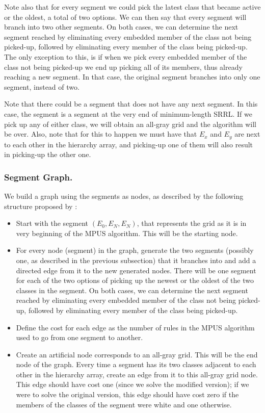  Note also that for every segment we could pick the latest class that became active or the oldest, a total of two options. We can then say that every segment will branch into two other segments. On both cases, we can determine the next segment reached by eliminating every embedded member of the class not being picked-up, followed by eliminating every member of the class being picked-up. The only exception to this, is if when we pick every embedded member of the class not being picked-up we end up picking all of its members, thus already reaching a new segment. In that case, the original segment branches into only one segment, instead of two.

Note that there could be a segment that does not have any next segment. In this case, the segment is a segment at the very end of minimum-length SRRL. If we pick up any of either class, we will obtain an all-gray grid and the algorithm will be over. Also, note that for this to happen we must have that $E_{x}$ and $E_{y}$ are next to each other in the hierarchy array, and picking-up one of them will also result in picking-up the other one.

\subsubsection{Segment Graph.}

We build a graph using the segments as nodes, as described by the following structure proposed by \cite{ACJKLW07}:

\begin{itemize}

\item Start with the segment $(E_{0}, E_{N}, E_{N})$, that represents the grid as it is in very beginning of the MPUS algorithm. This will be the starting node.

\item For every node (segment) in the graph, generate the two segments (possibly one, as described in the previous subsection) that it branches into and add a directed edge from it to the new generated nodes.
 There will be one segment for each of the two options of picking up the newest or the oldest of the two classes in the segment. On both cases, we can determine the next segment reached by eliminating every embedded member of the class not being picked-up, followed by eliminating every member of the class being picked-up.

\item Define the cost for each edge as the number of rules in the MPUS algorithm used to go from one segment to another.

\item Create an artificial node corresponds to an all-gray grid. This will be the end node of the graph. Every time a segment has its two classes adjacent to each other in the hierarchy array, create an edge from it to this all-gray grid node.
 This edge should have cost one (since we solve the modified version);
if we were to solve the original version, this edge should have cost zero
if the members of the classes of the segment were white and one otherwise.

\end{itemize}

